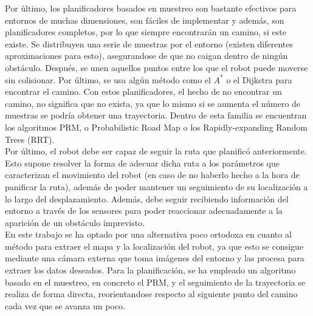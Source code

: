 Por último, los planificadores basados en muestreo son bastante efectivos para entornos de muchas dimensiones, son fáciles de implementar y además, son planificadores completos, por lo que siempre encontrarán un camino, si este existe. Se distribuyen una serie de muestras por el entorno (existen diferentes aproximaciones para esto), asegurandose de que no caigan dentro de ningún obstáculo. Después, se unen aquellos puntos entre los que el robot puede moverse sin colisionar. Por último, se usa algún método como el $A^*$ o el Dijkstra para encontrar el camino. Con estos planificadores, el hecho de no encontrar un camino, no significa que no exista, ya que lo mismo si se aumenta el número de muestras se podría obtener una trayectoria. Dentro de esta familia se encuentran los algoritmos PRM, o Probabilistic Road Map o los Rapidly-expanding Random Trees (RRT).\\ 

Por último, el robot debe ser capaz de seguir la ruta que planificó anteriormente. Esto supone resolver la forma de adecuar dicha ruta a los parámetros que caracterizan el movimiento del robot (en caso de no haberlo hecho a la hora de panificar la ruta), además de poder mantener un seguimiento de su localización a lo largo del desplazamiento. Además, debe seguir recibiendo información del entorno a través de los sensores para poder reaccionar adecuadamente a la aparición de un obstáculo imprevisto.\\

En este trabajo se ha optado por una alternativa poco ortodoxa en cuanto al método para extraer el mapa y la localización del robot, ya que esto se consigue mediante una cámara externa que toma imágenes del entorno y las procesa para extraer los datos deseados. Para la planificación, se ha empleado un algoritmo basado en el muestreo, en concreto el PRM, y el seguimiento de la trayectoria se realiza de forma directa, reorientandose respecto al siguiente punto del camino cada vez que se avanza un poco.\\     
